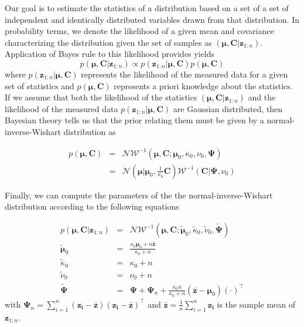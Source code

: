 \documentclass[11pt]{article}
\begin{document}
Our goal is to estimate the statistics of a distribution based on a set of a set of independent and identically distributed variables drawn from that distribution. In probability terms, we denote the likelihood of a given mean and covariance characterizing the distribution given the set of samples as $(\bm{\mu}, \mathbf{C} | \mathbf{z}_{1:n})$. Application of Bayes rule to this likelihood provides yields
\begin{equation}\label{eq:jointPDF_general}
	p(\bm{\mu}, \mathbf{C} | \mathbf{z}_{1:n}) \propto p(\mathbf{z}_{1:n} | \bm{\mu}, \mathbf{C}) p(\bm{\mu}, \mathbf{C})
\end{equation}
where $p(\mathbf{z}_{1:n} | \bm{\mu}, \mathbf{C})$ represents the likelihood of the measured data for a given set of statistics and $p(\bm{\mu}, \mathbf{C})$ represents a priori knowledge about the statistics. If we assume that both the likelihood of the statistics $(\bm{\mu}, \mathbf{C} | \mathbf{z}_{1:n})$ and the likelihood of the measured data $p(\mathbf{z}_{1:n} | \bm{\mu}, \mathbf{C})$ are Gaussian distributed, then Bayesian theory tells us that the prior relating them must be given by a normal-inverse-Wishart distribution \cite{Bernardo09} as

\begin{eqnarray}
p(\bm{\mu}, \mathbf{C}) & = & \mathcal{N}\mathcal{W}^{-1}( \bm{\mu}, \mathbf{C} ; \bm{\mu}_0, \kappa_0, \nu_0, \bm{\Psi} ) \label{eq:inf_prior} \\
{}&=&\mathcal{N}(\bm{\mu} | \bm{\mu}_0, \frac{1}{\kappa_0}\mathbf{C})
\mathcal{W}^{-1}(\mathbf{C} | \bm{\Psi}, \nu_0)
\end{eqnarray}

\noindent Finally, we can compute the parameters of the the normal-inverse-Wishart distribution \cite{murphy07} according to the following equations

\begin{eqnarray}
p(\bm{\mu}, \mathbf{C} | \mathbf{z}_{1:n}) &=& \mathcal{N}\mathcal{W}^{-1}( \bm{\mu}, \mathbf{C} ; \tilde{\bm{\mu}}_0, \tilde{\kappa}_0, \tilde{\nu}_0, \tilde{\bm{\Psi}} ) \\
\tilde{\bm{\mu}}_0 &=& \frac{\kappa_0\boldsymbol\mu_0+n\mathbf{\bar{z}}}{\kappa_0+n}  \\ 
\tilde{\kappa}_0 &=& \kappa_0+n \\ 
\tilde{\nu}_0  &=& \nu_0+n  \\
\tilde{\bm{\Psi}} &=&   \boldsymbol\Psi + \boldsymbol{\Psi}_n + \frac{\kappa_0 n}{\kappa_0+n}(\mathbf{\bar{z}}-\boldsymbol\mu_0)(\cdot)^\top 
\end{eqnarray}
\noindent with $\boldsymbol\Psi_n = \sum_{i=1}^n (\mathbf{z_i} - \mathbf{\bar{z}}) (\mathbf{z_i} - \mathbf{\bar{z}})^\top $
\noindent and $\mathbf{\bar{z}} = \frac{1}{n}\sum_{i=1}^n \mathbf{z_i}$ is the sample mean of $\mathbf{z}_{1:n}$.
\end{document}
